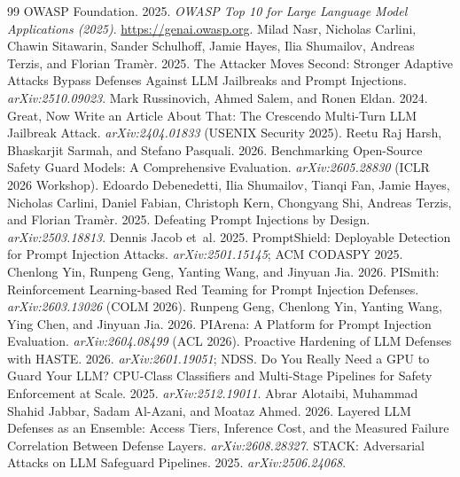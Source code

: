 \documentclass[11pt]{article}
\begin{document}
\begin{thebibliography}{99}
 OWASP Foundation. 2025. \emph{OWASP Top 10 for Large Language Model Applications (2025)}. \url{https://genai.owasp.org}.
 Milad Nasr, Nicholas Carlini, Chawin Sitawarin, Sander Schulhoff, Jamie Hayes, Ilia Shumailov, Andreas Terzis, and Florian Tram\`er. 2025. The Attacker Moves Second: Stronger Adaptive Attacks Bypass Defenses Against LLM Jailbreaks and Prompt Injections. \emph{arXiv:2510.09023}.
 Mark Russinovich, Ahmed Salem, and Ronen Eldan. 2024. Great, Now Write an Article About That: The Crescendo Multi-Turn LLM Jailbreak Attack. \emph{arXiv:2404.01833} (USENIX Security 2025).
 Reetu Raj Harsh, Bhaskarjit Sarmah, and Stefano Pasquali. 2026. Benchmarking Open-Source Safety Guard Models: A Comprehensive Evaluation. \emph{arXiv:2605.28830} (ICLR 2026 Workshop).
 Edoardo Debenedetti, Ilia Shumailov, Tianqi Fan, Jamie Hayes, Nicholas Carlini, Daniel Fabian, Christoph Kern, Chongyang Shi, Andreas Terzis, and Florian Tram\`er. 2025. Defeating Prompt Injections by Design. \emph{arXiv:2503.18813}.
 Dennis Jacob et~al. 2025. PromptShield: Deployable Detection for Prompt Injection Attacks. \emph{arXiv:2501.15145}; ACM CODASPY 2025.
 Chenlong Yin, Runpeng Geng, Yanting Wang, and Jinyuan Jia. 2026. PISmith: Reinforcement Learning-based Red Teaming for Prompt Injection Defenses. \emph{arXiv:2603.13026} (COLM 2026).
 Runpeng Geng, Chenlong Yin, Yanting Wang, Ying Chen, and Jinyuan Jia. 2026. PIArena: A Platform for Prompt Injection Evaluation. \emph{arXiv:2604.08499} (ACL 2026).
 Proactive Hardening of LLM Defenses with HASTE. 2026. \emph{arXiv:2601.19051}; NDSS.
 Do You Really Need a GPU to Guard Your LLM? CPU-Class Classifiers and Multi-Stage Pipelines for Safety Enforcement at Scale. 2025. \emph{arXiv:2512.19011}.
 Abrar Alotaibi, Muhammad Shahid Jabbar, Sadam Al-Azani, and Moataz Ahmed. 2026. Layered LLM Defenses as an Ensemble: Access Tiers, Inference Cost, and the Measured Failure Correlation Between Defense Layers. \emph{arXiv:2608.28327}.
 STACK: Adversarial Attacks on LLM Safeguard Pipelines. 2025. \emph{arXiv:2506.24068}.

\end{thebibliography}
\end{document}
